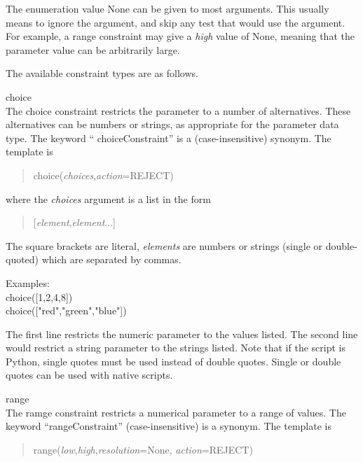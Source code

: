 The enumeration value {\vt None} can be given to most arguments.  This
usually means to ignore the argument, and skip any test that would use
the argument.  For example, a range constraint may give a {\it high}
value of {\vt None}, meaning that the parameter value can be
arbitrarily large.

The available constraint types are as follows.

\begin{description}
\item{\vt choice}\\
The {\vt choice} constraint restricts the parameter to a number of
alternatives.  These alternatives can be numbers or strings, as
appropriate for the parameter data type.  The keyword ``{\vt
choiceConstraint}'' is a (case-insensitive) synonym.  The template is

\begin{quote}
{\vt choice(}{\it choices\/},{\it action\/}={\vt REJECT)}
\end{quote}

where the {\it choices} argument is a list in the form

\begin{quote}
{\vt [}{\it element\/},{\it element\/}...{\vt ]}
\end{quote}

The square brackets are literal, {\it elements} are numbers or strings
(single or double-quoted) which are separated by commas.

Examples:\\
{\vt choice([1,2,4,8])}\\
{\vt choice(["red","green","blue"])}

The first line restricts the numeric parameter to the values listed. 
The second line would restrict a string parameter to the strings
listed.  Note that if the script is Python, single quotes must be used
instead of double quotes.  Single or double quotes can be used with
native scripts.

\item{\vt range}\\
The {\vt ramge} constraint restricts a numerical parameter to a
range of values.  The keyword ``{\vt rangeConstraint}''
(case-insensitive) is a synonym.  The template is

\begin{quote}
{\vt range(}{\it low\/},{\it high\/},{\it resolution\/}={\vt None},{\it
 action\/}={\vt REJECT)}
\end{quote}


\end{description}
